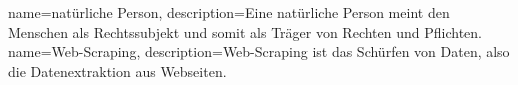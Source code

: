 {
name={natürliche Person},
description={\glqq Eine natürliche Person meint den Menschen als Rechtssubjekt und somit als Träger von Rechten und Pflichten.\grqq{} \cite{NatPerson_2018}}
}
{
name={Web-Scraping},
description={\glqq Web-Scraping ist das Schürfen von Daten, also die Datenextraktion aus Webseiten.\grqq{} \cite{webScraping_2021}}
}




